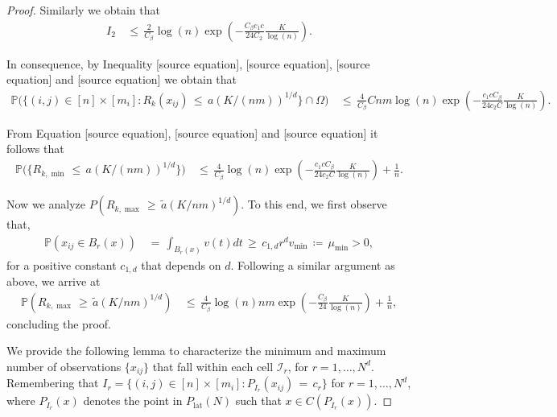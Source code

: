 \documentclass[twoside,11pt]{article}
\makeatletter
\newcommand{\discardlabel}[1]{}
\newcommand{\discardtwo}[2]{}
\newcommand{\legacyref}[1]{\textup{[source ref.]}}
\newcommand{\legacyeqref}[1]{\textup{[source equation]}}
\newenvironment{legacycomparison}{%
  \begingroup\color{legacygray}%
  \let\label\discardlabel
  \let\originallabel\discardlabel
  \let\ref\legacyref
  \let\pageref\legacyref
  \let\eqref\legacyeqref
  \let\cref\legacyref
  \let\Cref\legacyref
  \let\autoref\legacyref
  \let\aliasref\discardtwo
}{\endgroup}
\newcommand{\aliasref}[2]{%
  \@ifundefined{r@#2}{}{%
    \expandafter\let\csname r@#1\expandafter\endcsname\csname r@#2\endcsname}}
\makeatother
\begin{document}
\begin{legacycomparison}
\begin{proof}
Similarly we obtain that
\begin{align}
    I_2 &\,\leq\, \frac{2}{C_{\beta}} \log(n) \exp\left(-\frac{C_{\beta}c_1c}{24C_2} \frac{K}{\log(n)} \right). \label{eq:285}
\end{align}

In consequence, by Inequality \eqref{eq:277}, \eqref{eq:278}, \eqref{eq:284} and \eqref{eq:285} we obtain that
\begin{align}
    \mathbb{P}\Bigg( \{ (i,j) \in [n] \times [m_i] : R_{k}(x_{ij}) \,\leq\, a(K/(nm))^{1/d} \} \cap  \Omega \Bigg) 
    &\,\leq\, \frac{4}{C_{\beta}} Cnm \log(n) \exp\left(-\frac{c_1cC_{\beta}}{24c_2C} \frac{K}{ \log(n)} \right). \label{eq:286}
\end{align}

From Equation \eqref{eq:274}, \eqref{eq:275} and \eqref{eq:286} it follows that
\begin{align}
    \mathbb{P}\Bigg( \{ R_{k,\min} \,\leq\, a(K/(nm))^{1/d} \} \Bigg) 
    &\,\leq\, \frac{4}{C_{\beta}} \log(n) \exp\left(-\frac{c_1cC_{\beta}}{24c_2C} \frac{K}{ \log(n)} \right) + \frac{1}{n}. \label{eq:287}
\end{align}

Now we analyze \( P(R_{k,\max} \,\geq\, \tilde{a}(K/nm)^{1/d}) \). To this end, we first observe that,
\begin{align}
    \mathbb{P}(x_{ij} \in B_{r}(x)) &\,=\, \int_{B_{r}(x)} v(t)dt \,\geq\, c_{1,d}r^d v_{\min} \,\coloneqq\,  \mu_{\min} > 0,
\end{align}
for a positive constant \( c_{1,d} \) that depends on \( d \). Following a similar argument as above, we arrive at
\begin{align}
    \mathbb{P}(R_{k,\max} \,\geq\, \tilde{a}(K/nm)^{1/d}) 
    &\,\leq\, \frac{4}{C_{\beta}} \log(n)nm \exp\left(-\frac{C_{\beta}}{24} \frac{K}{\log(n)} \right) + \frac{1}{n}, 
\end{align}
concluding the proof.

We provide the following lemma to characterize the minimum and maximum number of observations \(\{x_{ij}\}\) that fall within each cell \(\mathcal{I}_r\), for \(r = 1, \ldots, N^d\). Remembering that \(I_r = \{(i,j) \in [n] \times [m_i] : P_{I_r}(x_{ij}) \,=\, c_r\}\) for \(r = 1, \ldots, N^d\), where \(P_{I_r}(x)\) denotes the point in \(P_{\text{lat}}(N)\) such that \(x \in C(P_{I_r}(x))\).
\end{proof}


\end{legacycomparison}
\end{document}
